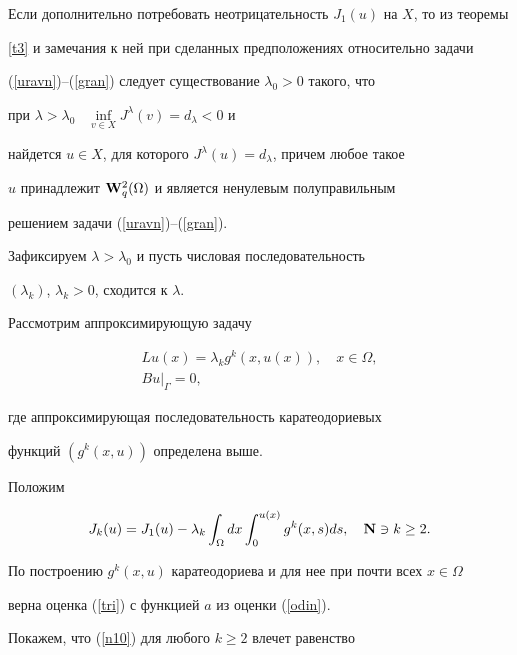 Если дополнительно потребовать неотрицательность $J_1(u)$ на $X$, то из теоремы


\ref{t3} и замечания к ней при сделанных предположениях относительно задачи


(\ref{uravn})--(\ref{gran}) следует существование $\lambda_0>0$ такого, что


при $\lambda>\lambda_0$ \ $\inf\limits_{v\in X}J^\lambda(v)=d_{\lambda}<0$ и


найдется $u\in X$, для которого $J^\lambda(u)=d_\lambda$, причем любое такое


$u$ принадлежит ${\bold W}_q^2(\Omega)$ и является ненулевым полуправильным


решением задачи (\ref{uravn})--(\ref{gran}).





Зафиксируем $\lambda>\lambda_0$ и пусть числовая последовательность


$(\lambda_k)$, $\lambda_k>0$, сходится к $\lambda$.


Рассмотрим аппроксимирующую задачу


\begin{gather}


\label{uravn1}


Lu(x)=\lambda_k g^k(x,u(x)), \quad x\in\Omega,\\


\label{gran1}


Bu|_{ \Gamma}=0,


\end{gather}


где аппроксимирующая последовательность каратеодориевых 


функций $(g^k(x, u))$ определена выше.





Положим


$$


J_k(u)=J_1(u)-\lambda_k\int_{\Omega}dx\int_0^{u(x)}g^k(x,s)ds,


\quad {\bold N}\ni k\geq 2.


$$


По построению $g^k(x, u)$ каратеодориева и для нее при почти всех $x\in\Omega$


верна оценка (\ref{tri}) с функцией $a$ из оценки (\ref{odin}).





Покажем, что (\ref{n10}) для любого $k\geq 2$ влечет равенство


